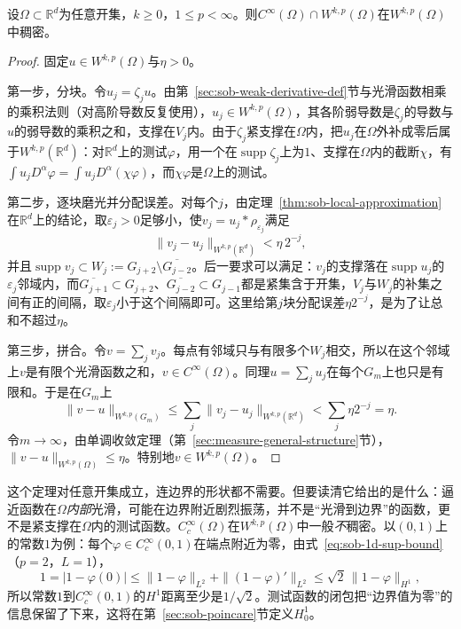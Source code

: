\begin{theorem}[整域光滑逼近]
\label{thm:sob-meyers-serrin}
设$\Omega\subset\mathbb R^d$为任意开集，$k\ge0$，$1\le p<\infty$。则$C^\infty(\Omega)\cap W^{k,p}(\Omega)$在$W^{k,p}(\Omega)$中稠密。
\end{theorem}

\begin{proof}
固定$u\in W^{k,p}(\Omega)$与$\eta>0$。

第一步，分块。令$u_j=\zeta_ju$。由第~\ref{sec:sob-weak-derivative-def}节与光滑函数相乘的乘积法则（对高阶导数反复使用），$u_j\in W^{k,p}(\Omega)$，其各阶弱导数是$\zeta_j$的导数与$u$的弱导数的乘积之和，支撑在$V_j$内。由于$\zeta_j$紧支撑在$\Omega$内，把$u_j$在$\Omega$外补成零后属于$W^{k,p}(\mathbb R^d)$：对$\mathbb R^d$上的测试$\varphi$，用一个在$\operatorname{supp}\zeta_j$上为$1$、支撑在$\Omega$内的截断$\chi$，有$\int u_jD^\alpha\varphi=\int u_jD^\alpha(\chi\varphi)$，而$\chi\varphi$是$\Omega$上的测试。

第二步，逐块磨光并分配误差。对每个$j$，由定理~\ref{thm:sob-local-approximation}在$\mathbb R^d$上的结论，取$\varepsilon_j>0$足够小，使$v_j=u_j*\rho_{\varepsilon_j}$满足
\[
 \|v_j-u_j\|_{W^{k,p}(\mathbb R^d)}<\eta\,2^{-j},
\]
并且$\operatorname{supp}v_j\subset W_j:=G_{j+2}\setminus\overline{G_{j-2}}$。后一要求可以满足：$v_j$的支撑落在$\operatorname{supp}u_j$的$\varepsilon_j$邻域内，而$\overline{G_{j+1}}\subset G_{j+2}$、$\overline{G_{j-2}}\subset G_{j-1}$都是紧集含于开集，$V_j$与$W_j$的补集之间有正的间隔，取$\varepsilon_j$小于这个间隔即可。这里给第$j$块分配误差$\eta2^{-j}$，是为了让总和不超过$\eta$。

第三步，拼合。令$v=\sum_jv_j$。每点有邻域只与有限多个$W_j$相交，所以在这个邻域上$v$是有限个光滑函数之和，$v\in C^\infty(\Omega)$。同理$u=\sum_ju_j$在每个$G_m$上也只是有限和。于是在$G_m$上
\[
 \|v-u\|_{W^{k,p}(G_m)}\le\sum_j\|v_j-u_j\|_{W^{k,p}(\mathbb R^d)}<\sum_j\eta2^{-j}=\eta .
\]
令$m\to\infty$，由单调收敛定理（第~\ref{sec:measure-general-structure}节），$\|v-u\|_{W^{k,p}(\Omega)}\le\eta$。特别地$v\in W^{k,p}(\Omega)$。
\end{proof}

这个定理对任意开集成立，连边界的形状都不需要。但要读清它给出的是什么：逼近函数在$\Omega$\emph{内部}光滑，可能在边界附近剧烈振荡，并不是“光滑到边界”的函数，更不是紧支撑在$\Omega$内的测试函数。$C_c^\infty(\Omega)$在$W^{k,p}(\Omega)$中一般\emph{不}稠密。以$(0,1)$上的常数$1$为例：每个$\varphi\in C_c^\infty(0,1)$在端点附近为零，由式~\eqref{eq:sob-1d-sup-bound}（$p=2$，$L=1$），
\[
 1=|1-\varphi(0)|\le\|1-\varphi\|_{L^2}+\|(1-\varphi)'\|_{L^2}\le\sqrt2\,\|1-\varphi\|_{H^1},
\]
所以常数$1$到$C_c^\infty(0,1)$的$H^1$距离至少是$1/\sqrt2$。测试函数的闭包把“边界值为零”的信息保留了下来，这将在第~\ref{sec:sob-poincare}节定义$H_0^1$。

